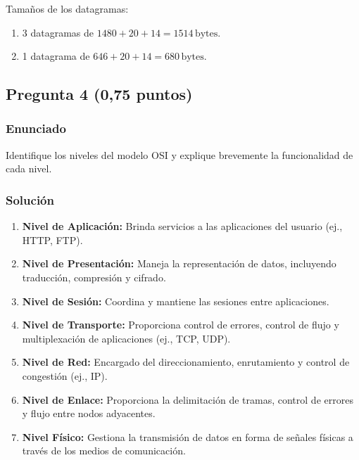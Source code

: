 \documentclass[12pt]{article}
\begin{document}
Tamaños de los datagramas:  
\begin{enumerate}
    \item 3 datagramas de \( 1480 + 20 + 14 = 1514 \, \text{bytes} \).
    \item 1 datagrama de \( 646 + 20 + 14 = 680 \, \text{bytes} \).
\end{enumerate}

\subsection{Pregunta 4 (0,75 puntos)}
\subsubsection{Enunciado}
Identifique los niveles del modelo OSI y explique brevemente la funcionalidad de cada nivel.

\subsubsection{Solución}
\begin{enumerate}
    \item \textbf{Nivel de Aplicación:} Brinda servicios a las aplicaciones del usuario (ej., HTTP, FTP).
    \item \textbf{Nivel de Presentación:} Maneja la representación de datos, incluyendo traducción, compresión y cifrado.
    \item \textbf{Nivel de Sesión:} Coordina y mantiene las sesiones entre aplicaciones.
    \item \textbf{Nivel de Transporte:} Proporciona control de errores, control de flujo y multiplexación de aplicaciones (ej., TCP, UDP).
    \item \textbf{Nivel de Red:} Encargado del direccionamiento, enrutamiento y control de congestión (ej., IP).
    \item \textbf{Nivel de Enlace:} Proporciona la delimitación de tramas, control de errores y flujo entre nodos adyacentes.
    \item \textbf{Nivel Físico:} Gestiona la transmisión de datos en forma de señales físicas a través de los medios de comunicación.
\end{enumerate}
\end{document}
